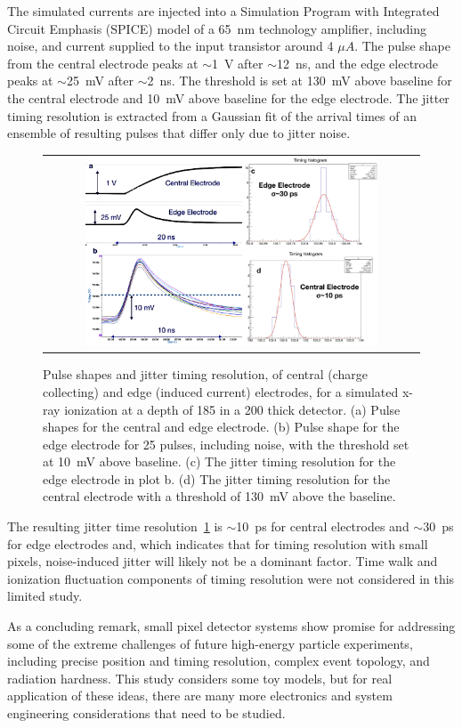 The simulated currents are injected into a Simulation Program with Integrated Circuit Emphasis (SPICE) model of a \SI{65}{\nm} technology amplifier, including noise, and current supplied to the input transistor around 4 $\mu A$.
The pulse shape from the central electrode peaks at $\sim$\SI{1}{\V} after $\sim$\SI{12}{\ns}, and the edge electrode peaks at $\sim$\SI{25}{\mV} after $\sim$\SI{2}{\ns}.
The threshold is set at \SI{130}{\mV} above baseline for the central electrode and \SI{10}{\mV} above baseline for the edge electrode.
The jitter timing resolution is extracted from a Gaussian fit of the arrival times of an ensemble of resulting pulses that differ only due to jitter noise.
\begin{figure}[!h]
  \begin{center}
    \begin{tabular}{c}
      \includegraphics[width=0.80\textwidth]{fig_FastTiming/TimingResolutions.png}
    \end{tabular}
    \caption{Pulse shapes and jitter timing resolution, of central (charge collecting) and edge (induced current) electrodes, for a simulated x-ray ionization at a depth of \SI{185}{\micron} in a \SI{200}{\micron} thick detector.
        (a) Pulse shapes for the central and edge electrode. 
        (b) Pulse shape for the edge electrode for 25 pulses, including noise, with the threshold set at \SI{10}{\mV} above baseline.
        (c) The jitter timing resolution for the edge electrode in plot b.
        (d) The jitter timing resolution for the central electrode with a threshold of \SI{130}{\mV} above the baseline.
            }
    \label{TimingResolutions}
  \end{center}
\end{figure}

The resulting jitter time resolution~\ref{TimingResolutions} is $\sim$\SI{10}{\ps} for central electrodes and $\sim$\SI{30}{\ps} for edge electrodes and, which indicates that for timing resolution with small pixels, noise-induced jitter will likely not be a dominant factor.
Time walk and ionization fluctuation components of timing resolution were not considered in this limited study.

As a concluding remark, small pixel detector systems show promise for addressing some of the extreme challenges of future high-energy particle experiments, including precise position and timing resolution, complex event topology, and radiation hardness.
This study considers some toy models, but for real application of these ideas, there are many more electronics and system engineering considerations that need to be studied.
